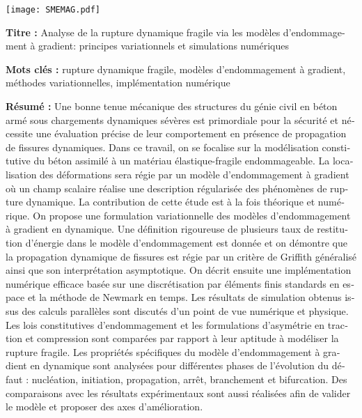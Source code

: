 \pagestyle{empty}

\begin{flushleft}
\texttt{[image: SMEMAG.pdf]}

\vspace{20pt}

\begin{mdframed}
\begin{otherlanguage}{french}
\textbf{Titre :} Analyse de la rupture dynamique fragile via les modèles d'endommagement à gradient: principes variationnels et simulations numériques

\textbf{Mots clés :} rupture dynamique fragile, modèles d'endommagement à gradient, méthodes variationnelles, implémentation numérique

\textbf{Résumé :} Une bonne tenue mécanique des structures du génie civil en béton armé sous chargements dynamiques sévères est primordiale pour la sécurité et nécessite une évaluation précise de leur comportement en présence de propagation de fissures dynamiques. Dans ce travail, on se focalise sur la modélisation constitutive du béton assimilé à un matériau élastique-fragile endommageable. La localisation des déformations sera régie par un modèle d'endommagement à gradient où un champ scalaire réalise une description régularisée des phénomènes de rupture dynamique. La contribution de cette étude est à la fois théorique et numérique. On propose une formulation variationnelle des modèles d'endommagement à gradient en dynamique. Une définition rigoureuse de plusieurs taux de restitution d'énergie dans le modèle d'endommagement est donnée et on démontre que la propagation dynamique de fissures est régie par un critère de Griffith généralisé ainsi que son interprétation asymptotique. On décrit ensuite une implémentation numérique efficace basée sur une discrétisation par éléments finis standards en espace et la méthode de Newmark en temps. Les résultats de simulation obtenus issus des calculs parallèles sont discutés d'un point de vue numérique et physique. Les lois constitutives d'endommagement et les formulations d'asymétrie en traction et compression sont comparées par rapport à leur aptitude à modéliser la rupture fragile. Les propriétés spécifiques du modèle d'endommagement à gradient en dynamique sont analysées pour différentes phases de l'évolution du défaut : nucléation, initiation, propagation, arrêt, branchement et bifurcation. Des comparaisons avec les résultats expérimentaux sont aussi réalisées afin de valider le modèle et proposer des axes d'amélioration.
\end{otherlanguage}
\end{mdframed}


\end{flushleft}
